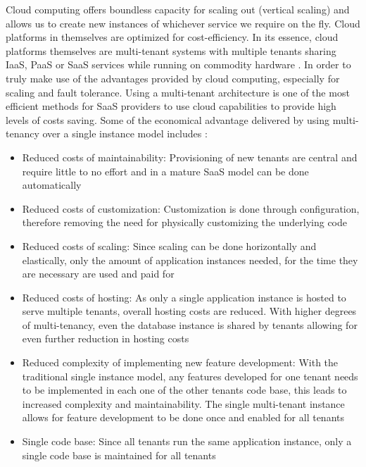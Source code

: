 Cloud computing offers boundless capacity for scaling out (vertical scaling) and allows us to create new instances of whichever service we require on the fly. Cloud platforms in themselves are optimized for cost-efficiency. In its essence, cloud platforms themselves are multi-tenant systems with multiple tenants sharing IaaS, PaaS or SaaS services while running on commodity hardware \cite{Wilder2012-so}. In order to truly make use of the advantages provided by cloud computing, especially for scaling and fault tolerance. Using a multi-tenant architecture is one of the most efficient methods for SaaS providers to use cloud capabilities to provide high levels of costs saving.
Some of the economical advantage delivered by using multi-tenancy over a single instance model includes \cite{Betts2012-ad}:
\begin{itemize}
\item Reduced costs of maintainability: Provisioning of new tenants are central and require little to no effort and in a mature SaaS model can be done automatically
\item Reduced costs of customization: Customization is done through configuration, therefore removing the need for physically customizing the underlying code
\item Reduced costs of scaling: Since scaling can be done horizontally and elastically, only the amount of application instances needed, for the time they are necessary are used and paid for
\item Reduced costs of hosting: As only a single application instance is hosted to serve multiple tenants, overall hosting costs are reduced. With higher degrees of multi-tenancy, even the database instance is shared by tenants allowing for even further reduction in hosting costs
\item Reduced complexity of implementing new feature development: With the traditional single instance model, any features developed for one tenant needs to be implemented in each one of the other tenants code base, this leads to increased complexity and maintainability. The single multi-tenant instance allows for feature development to be done once and enabled for all tenants
\item Single code base: Since all tenants run the same application instance, only a single code base is maintained for all tenants
\end{itemize}

